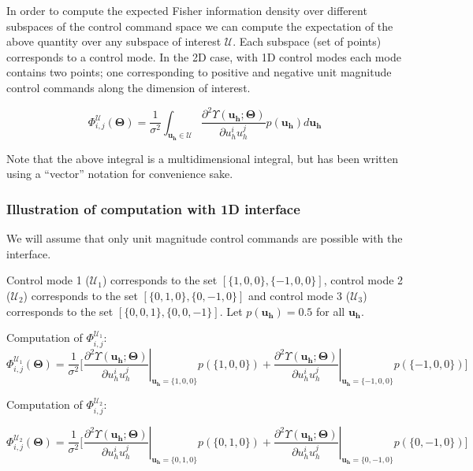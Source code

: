 \documentclass[]{article}
\begin{document}
In order to compute the expected Fisher information density over different subspaces of the control command space we can compute the expectation of the above quantity over any subspace of interest $\mathcal{U}$. Each subspace (set of points) corresponds to a control mode. In the 2D case, with 1D control modes each mode contains two points; one corresponding to positive and negative unit magnitude control commands along the dimension of interest. 

\begin{equation*}
\Phi^{\mathcal{U}}_{i,j}(\boldsymbol{\Theta}) = \frac{1}{\sigma^2}\int_{\boldsymbol{u_h} \in \mathcal{U}}\frac{\partial^2\Upsilon(\boldsymbol{u_h}; \boldsymbol{\Theta})}{\partial u_h^iu_h^j}p(\boldsymbol{u_h})d\boldsymbol{u_h}
\end{equation*}

Note that the above integral is a multidimensional integral, but has been written using a ``vector'' notation for convenience sake. 

\subsubsection*{Illustration of computation with 1D interface}

We will assume that only unit magnitude control commands are possible with the interface.

\noindent Control mode 1 ($\mathcal{U}_1$) corresponds to the set $[\{1,0,0\}, \{-1,0,0\}]$, control mode 2 ($\mathcal{U}_2$) corresponds to the set $[\{0,1,0\}, \{0,-1,0\}]$ and control mode 3 ($\mathcal{U}_3$) corresponds to the set $[\{0,0,1\}, \{0,0,-1\}]$.
Let $p(\boldsymbol{u_h}) = 0.5$ for all $\boldsymbol{u_h}$. 


\noindent Computation of $\Phi^{\mathcal{U}_1}_{i,j}$:
\begin{equation*}
\Phi^{\mathcal{U}_1}_{i,j}(\boldsymbol{\Theta}) = \frac{1}{\sigma^2}\Big[^{}\left.\frac{\partial^2\Upsilon(\boldsymbol{u_h}; \boldsymbol{\Theta})}{\partial u_h^iu_h^j}\right\vert_{\boldsymbol{u_h} = \{1,0,0\}}p(\{1,0,0\}) + \left.\frac{\partial^2\Upsilon(\boldsymbol{u_h}; \boldsymbol{\Theta})}{\partial u_h^iu_h^j}\right\vert_{\boldsymbol{u_h} = \{-1,0,0\}}p(\{-1,0,0\})\Big]
\end{equation*}

\noindent Computation of $\Phi^{\mathcal{U}_2}_{i,j}$:

\begin{equation*}
\Phi^{\mathcal{U}_2}_{i,j}(\boldsymbol{\Theta}) = \frac{1}{\sigma^2}\Big[^{}\left.\frac{\partial^2\Upsilon(\boldsymbol{u_h}; \boldsymbol{\Theta})}{\partial u_h^iu_h^j}\right\vert_{\boldsymbol{u_h} = \{0,1,0\}}p(\{0,1,0\}) + \left.\frac{\partial^2\Upsilon(\boldsymbol{u_h}; \boldsymbol{\Theta})}{\partial u_h^iu_h^j}\right\vert_{\boldsymbol{u_h} = \{0,-1,0\}}p(\{0,-1,0\})\Big]
\end{equation*}
\end{document}
